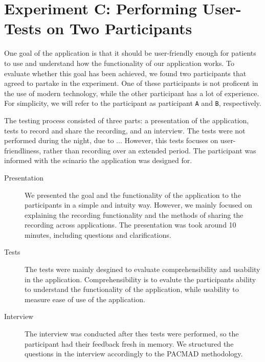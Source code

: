 \section{Experiment C: Performing User-Tests on Two Participants}
One goal of the application is that it should be user-friendly enough for patients to use and understand how the functionality of our application works. To evaluate whether this goal has been achieved, we found two participants that agreed to partake in the experiment. One of these participants is not proficent in the use of modern technology, while the other participant has a lot of experience. For simplicity, we will refer to the participant as participant \verb|A| and \verb|B|, respectively. 

The testing process consisted of three parts: a presentation of the application, tests to record and share the recording, and an interview. The tests were not performed during the night, due to ... However, this tests focuses on user-friendliness, rather than recording over an extended period. The participant was informed with the scinario the application was designed for. 

\begin{description}
    \item[Presentation] We presented the goal and the functionality of the application to the participants in a simple and intuity way. However, we mainly focused on explaining the recording functionality and the methods of sharing the recording across applications. The presentation was took around 10 minutes, including questions and clarifications.  
    \item[Tests] The tests were mainly desgined to evaluate comprehensibility and usability in the application. Comprehensibility is to evalute the participants ability to understand the functionality of the application, while usability to measure ease of use of the application.
    \item[Interview] The interview was conducted after thes tests were performed, so the participant had their feedback fresh in memory. We structured the questions in the interview accordingly to the PACMAD methodology. 
\end{description}


